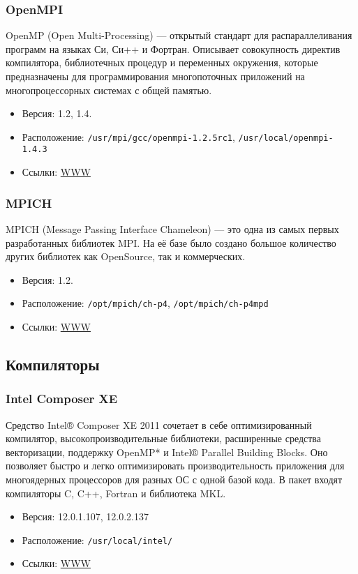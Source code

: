 \documentclass[a4paper,8pt]{extreport}
\begin{document}
\subsubsection{OpenMPI}
OpenMP (Open Multi-Processing) — открытый стандарт для распараллеливания программ на языках Си, Си++ и Фортран.
Описывает совокупность директив компилятора, библиотечных процедур и переменных окружения, которые предназначены 
для программирования многопоточных приложений на многопроцессорных системах с общей памятью.
\begin{itemize}
 \item Версия: 1.2, 1.4.
 \item Расположение: \verb|/usr/mpi/gcc/openmpi-1.2.5rc1|, \verb|/usr/local/openmpi-1.4.3|
 \item Ссылки: \href{http://www.open-mpi.org/}{WWW}
\end{itemize}

\subsubsection{MPICH}
MPICH (Message Passing Interface Chameleon) — это одна из самых первых разработанных библиотек MPI. 
На её базе было создано большое количество других библиотек как OpenSource, так и коммерческих.

\begin{itemize}
 \item Версия: 1.2.
 \item Расположение: \verb|/opt/mpich/ch-p4|, \verb|/opt/mpich/ch-p4mpd|
 \item Ссылки: \href{http://www.mcs.anl.gov/research/projects/mpich2/}{WWW}
\end{itemize}

\subsection{Компиляторы}
\subsubsection{Intel Composer XE}
Средство Intel® Composer XE 2011 сочетает в себе оптимизированный компилятор, высокопроизводительные библиотеки,
расширенные средства векторизации, поддержку OpenMP* и Intel® Parallel Building Blocks. Оно позволяет быстро и
легко оптимизировать производительность приложения для многоядерных процессоров для разных ОС с одной базой кода.
В пакет входят компиляторы C, C++, Fortran и библиотека MKL.
\begin{itemize}
 \item Версия: 12.0.1.107, 12.0.2.137
 \item Расположение: \verb|/usr/local/intel/|
 \item Ссылки: \href{http://software.intel.com/en-us/articles/intel-composer-xe/}{WWW}
\end{itemize}
\end{document}

